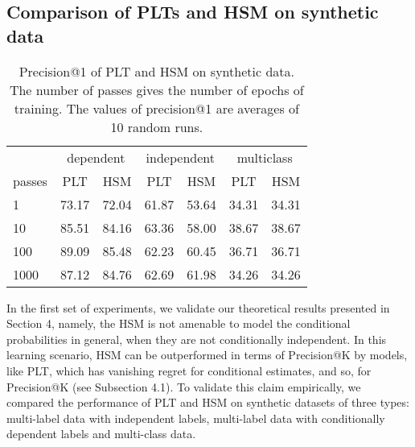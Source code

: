 \documentclass{article}
\newcommand{\Algo}[1]{\textsc{#1}}
\renewcommand{\vec}[1]{\boldsymbol{#1}}
\newcommand{\bx}{\vec{x}}
\newcommand{\bw}{\vec{w}}
\begin{document}
{%

\subsection{Comparison of PLTs and HSM on synthetic data}
\label{sec:empirical-synthetic}

\begin{table}[]
	\centering
	\caption{Precision@1 of PLT and HSM on synthetic data. The number of passes gives the number of epochs of training. The values of precision@1 are averages of 10 random runs.}
	\label{tab:synthetic1}
\begin{tabular}{l|rr|rr|rr}
	\toprule
	 & \multicolumn{2}{c|}{dependent}                     & \multicolumn{2}{c|}{independent}                   & \multicolumn{2}{c}{multiclass}                    \\
	 passes & \multicolumn{1}{c}{PLT} & \multicolumn{1}{c|}{HSM} & \multicolumn{1}{c}{PLT} & \multicolumn{1}{c|}{HSM} & \multicolumn{1}{c}{PLT} & \multicolumn{1}{c}{HSM} \\
	\midrule
	1      & 73.17 & 72.04 & 61.87    & 53.64 & 34.31  & 34.31  \\
	10     & 85.51 & 84.16 & 63.36    & 58.00 & 38.67  & 38.67  \\
	100    & 89.09 & 85.48 & 62.23    & 60.45 & 36.71  & 36.71  \\
	1000   & 87.12 & 84.76 & 62.69    & 61.98 & 34.26  & 34.26 \\
	\bottomrule
\end{tabular}
\vspace{-0.4cm}
\end{table}


In the first set of experiments, we validate our theoretical results presented in Section 4, namely, the \Algo{HSM} is not amenable to model the conditional probabilities in general, when they are not conditionally independent. In this learning scenario, \Algo{HSM} can be outperformed in terms of Precision@K by models, like \Algo{PLT}, which has vanishing regret for conditional estimates, and so, for Precision@K (see Subsection 4.1). To validate this claim empirically, we compared the performance of \Algo{PLT} and \Algo{HSM} on synthetic datasets of three types: multi-label data with independent labels, multi-label data with conditionally dependent labels and multi-class data. 


}
\end{document}
